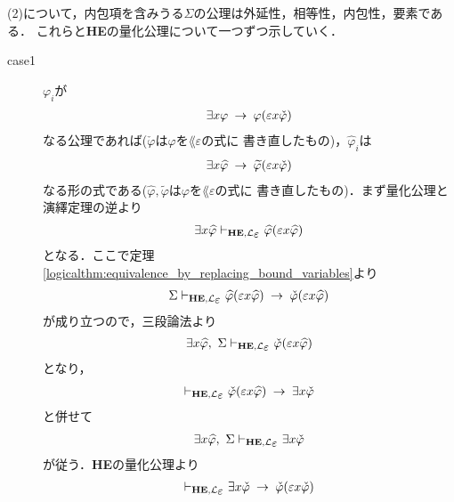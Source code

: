\begin{metaprf}
		(2)について，内包項を含みうる$\Sigma$の公理は外延性，相等性，内包性，要素である．
		これらと{\bf HE}の量化公理について一つずつ示していく．
		\begin{description}
			\item[case1] $\varphi_{i}$が
				\begin{align}
					\exists x \varphi \hspace{0.25em}\rightarrow\hspace{0.25em} \varphi(\varepsilon x \check{\varphi})
				\end{align}
				なる公理であれば($\check{\varphi}$は$\varphi$を$\lang{\varepsilon}$の式に
				書き直したもの)，$\widehat{\varphi}_{i}$は
				\begin{align}
					\exists x \widehat{\varphi} \hspace{0.25em}\rightarrow\hspace{0.25em} \widetilde{\varphi}(\varepsilon x \check{\varphi})
				\end{align}
				なる形の式である($\widehat{\varphi},\widetilde{\varphi}$は$\varphi$を$\lang{\varepsilon}$の式に
				書き直したもの)．まず量化公理と演繹定理の逆より
				\begin{align}
					\exists x \widehat{\varphi} \provable{\mbox{{\bf HE}},\lang{\varepsilon}} \widehat{\varphi}(\varepsilon x \widehat{\varphi})
				\end{align}
				となる．ここで定理\ref{logicalthm:equivalence_by_replacing_bound_variables}より
				\begin{align}
					\Sigma \provable{\mbox{{\bf HE}},\lang{\varepsilon}} \widehat{\varphi}(\varepsilon x \widehat{\varphi}) \rarrow \check{\varphi}(\varepsilon x \widehat{\varphi})
				\end{align}
				が成り立つので，三段論法より
				\begin{align}
					\exists x \widehat{\varphi},\ \Sigma \provable{\mbox{{\bf HE}},\lang{\varepsilon}} \check{\varphi}(\varepsilon x \widehat{\varphi})
				\end{align}
				となり，
				\begin{align}
					\provable{\mbox{{\bf HE}},\lang{\varepsilon}} \check{\varphi}(\varepsilon x \widehat{\varphi}) \rarrow \exists x \check{\varphi}
				\end{align}
				と併せて
				\begin{align}
					\exists x \widehat{\varphi},\ \Sigma \provable{\mbox{{\bf HE}},\lang{\varepsilon}} \exists x \check{\varphi}
				\end{align}
				が従う．{\bf HE}の量化公理より
				\begin{align}
					\provable{\mbox{{\bf HE}},\lang{\varepsilon}} \exists x \check{\varphi} \rarrow \check{\varphi}(\varepsilon x \check{\varphi})
				\end{align}

\end{description}
\end{metaprf}
